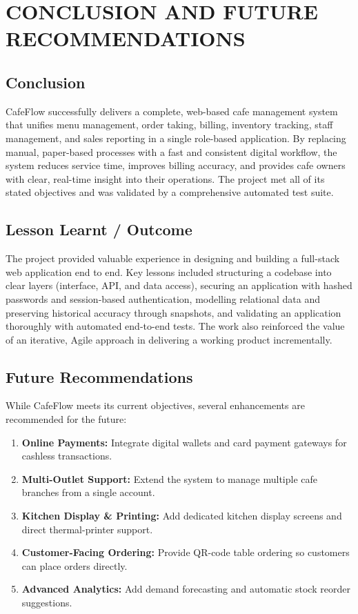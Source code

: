 \documentclass[12pt,a4paper]{report}
\begin{document}
\chapter{CONCLUSION AND FUTURE RECOMMENDATIONS}

\section{Conclusion}
CafeFlow successfully delivers a complete, web-based cafe management system that unifies menu
management, order taking, billing, inventory tracking, staff management, and sales reporting in
a single role-based application. By replacing manual, paper-based processes with a fast and
consistent digital workflow, the system reduces service time, improves billing accuracy, and
provides cafe owners with clear, real-time insight into their operations. The project met all
of its stated objectives and was validated by a comprehensive automated test suite.

\section{Lesson Learnt / Outcome}
The project provided valuable experience in designing and building a full-stack web application
end to end. Key lessons included structuring a codebase into clear layers (interface, API, and
data access), securing an application with hashed passwords and session-based authentication,
modelling relational data and preserving historical accuracy through snapshots, and validating
an application thoroughly with automated end-to-end tests. The work also reinforced the value
of an iterative, Agile approach in delivering a working product incrementally.

\section{Future Recommendations}
While CafeFlow meets its current objectives, several enhancements are recommended for the
future:
\begin{enumerate}
  \item \textbf{Online Payments:} Integrate digital wallets and card payment gateways for
        cashless transactions.
  \item \textbf{Multi-Outlet Support:} Extend the system to manage multiple cafe branches from
        a single account.
  \item \textbf{Kitchen Display \& Printing:} Add dedicated kitchen display screens and direct
        thermal-printer support.
  \item \textbf{Customer-Facing Ordering:} Provide QR-code table ordering so customers can place
        orders directly.
  \item \textbf{Advanced Analytics:} Add demand forecasting and automatic stock reorder
        suggestions.
\end{enumerate}
\end{document}
